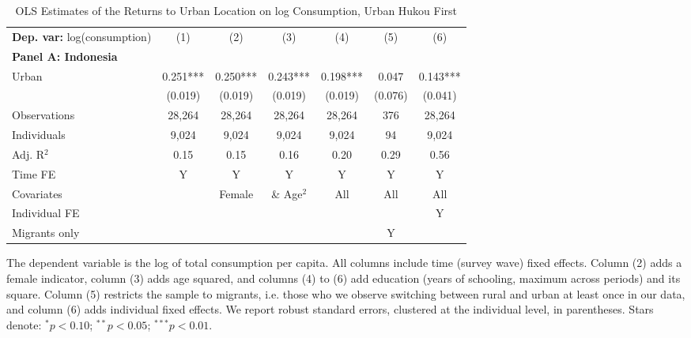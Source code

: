 \begin{table}[htbp] \centering \begin{threeparttable}
 \caption{OLS Estimates of the Returns to Urban Location on log Consumption, Urban Hukou First} 
 \label{tab:OLS_CHN_hukou_urban_first_consumption_urban_unb} 
\begin{tabular}{l cccccc} \toprule  \textbf{Dep. var:}  log(consumption) 
                    &\multicolumn{1}{c}{(1)}   &\multicolumn{1}{c}{(2)}   &\multicolumn{1}{c}{(3)}   &\multicolumn{1}{c}{(4)}   &\multicolumn{1}{c}{(5)}   &\multicolumn{1}{c}{(6)}   \\
\textbf{Panel A: Indonesia} \\
Urban               &       0.251***&       0.250***&       0.243***&       0.198***&       0.047   &       0.143***\\
                    &     (0.019)   &     (0.019)   &     (0.019)   &     (0.019)   &     (0.076)   &     (0.041)   \\
\addlinespace
Observations        &      28,264   &      28,264   &      28,264   &      28,264   &         376   &      28,264   \\
Individuals         &       9,024   &       9,024   &       9,024   &       9,024   &          94   &       9,024   \\
Adj. R$^{2}$        &        0.15   &        0.15   &        0.16   &        0.20   &        0.29   &        0.56   \\
\cmidrule{2 -7} Time FE & Y & Y & Y & Y & Y & Y \\ Covariates & & Female & \& Age$^2$ & All & All & All \\ Individual FE & & & & & & Y \\ Migrants only & & & & & Y & \\ \bottomrule \end{tabular} \begin{tablenotes}[flushleft] \footnotesize \item{The dependent variable is the log of total consumption per capita. All columns include time (survey wave) fixed effects. Column (2) adds a female indicator, column (3) adds age squared, and columns (4) to (6) add education (years of schooling, maximum across periods) and its square. Column (5) restricts the sample to migrants, i.e. those who we observe switching between rural and urban at least once in our data, and column (6) adds individual fixed effects. We report robust standard errors, clustered at the individual level, in parentheses. Stars denote: $^{*} p<0.10$; $^{**} p<0.05$; $^{***} p<0.01$.} \end{tablenotes} \end{threeparttable} \end{table}
